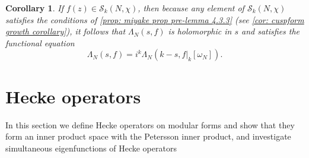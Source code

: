 \documentclass[10pt,leqno,twoside]{article}
\theoremstyle{plain}
\newtheorem{corollary}[lem]{Corollary}
\theoremstyle{definition}
\numberwithin{equation}{section}
\numberwithin{lem}{section}
\newcommand{\textib}[1]{\textbf{\textit{#1\index{#1}}}} %
\newcommand{\tbd}{{\Huge\color{red}{\textib{TO DO}}}}
\begin{document}
\begin{corollary}\label{cor: miyake cor 4.3.7}
    If $f(z)\in \mathcal S_k(N,\chi)$, then because any element of $\mathcal S_k(N,\chi)$ satisfies the conditions of \cref{prop: miyake prop pre-lemma 4.3.3} \textup{(}see \cref{cor: cuspform growth corollary}\textup{)}, it follows that $\varLambda_N(s,f)$ is holomorphic in $s$ and satisfies the functional equation
    \[\varLambda_N(s,f) = i^k\varLambda_N(k-s,f|_k[\omega_N]).\]
\end{corollary}

\newpage\section{Hecke operators}
In this section we define Hecke operators on modular forms and show that they form an inner product space with the Petersson inner product, and investigate simultaneous eigenfunctions of Hecke operators \tbd
\end{document}
